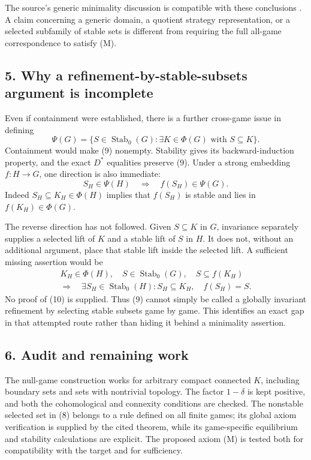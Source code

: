 \documentclass[11pt]{article}
\newcommand{\Stab}{\operatorname{Stab}_0}
\begin{document}
The source's generic minimality discussion is compatible with these conclusions \cite[Sections 6.1 and 10]{gw}. A claim concerning a generic domain, a quotient strategy representation, or a selected subfamily of stable sets is different from requiring the full all-game correspondence to satisfy (M).

\subsection*{5. Why a refinement-by-stable-subsets argument is incomplete}
Even if containment were established, there is a further cross-game issue in defining
\[
 \Psi(G)=\{S\in\Stab(G):
                     \exists K\in\Phi(G)\text{ with }S\subseteq K\}.
                                                               \tag{9}
\]
Containment would make (9) nonempty. Stability gives its backward-induction property, and the exact $D^*$ equalities preserve (9). Under a strong embedding $f:H\to G$, one direction is also immediate:
\[
 S_H\in\Psi(H)\quad\Longrightarrow\quad f(S_H)\in\Psi(G).
\]
Indeed $S_H\subseteq K_H\in\Phi(H)$ implies that $f(S_H)$ is stable and lies in $f(K_H)\in\Phi(G)$.

The reverse direction has not followed. Given $S\subseteq K$ in $G$, invariance separately supplies a selected lift of $K$ and a stable lift of $S$ in $H$. It does not, without an additional argument, place that stable lift inside the selected lift. A sufficient missing assertion would be
\[
 \begin{gathered}
 K_H\in\Phi(H),\quad S\in\Stab(G),\quad S\subseteq f(K_H)
 \\
 \Longrightarrow\quad
 \exists S_H\in\Stab(H):
 S_H\subseteq K_H,\quad f(S_H)=S.
 \end{gathered}                                                 \tag{10}
\]
No proof of (10) is supplied. Thus (9) cannot simply be called a globally invariant refinement by selecting stable subsets game by game. This identifies an exact gap in that attempted route rather than hiding it behind a minimality assertion.

\subsection*{6. Audit and remaining work}
The null-game construction works for arbitrary compact connected $K$, including boundary sets and sets with nontrivial topology. The factor $1-\delta$ is kept positive, and both the cohomological and connexity conditions are checked. The nonstable selected set in (8) belongs to a rule defined on all finite games; its global axiom verification is supplied by the cited theorem, while its game-specific equilibrium and stability calculations are explicit. The proposed axiom (M) is tested both for compatibility with the target and for sufficiency.
\end{document}
